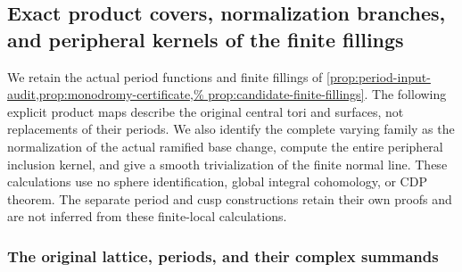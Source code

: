 \subsection{Exact product covers, normalization branches, and peripheral kernels of the finite fillings}
\label{ffcert:sec:finite-fillings}

We retain the actual period functions and finite fillings of
\cref{prop:period-input-audit,prop:monodromy-certificate,%
prop:candidate-finite-fillings}. The following explicit product maps
describe the original central tori and surfaces, not replacements of
their periods. We also identify the complete varying family as the
normalization of the actual ramified base change, compute the entire
peripheral inclusion kernel, and give a smooth trivialization of the
finite normal line. These calculations use no sphere identification,
global integral cohomology, or CDP theorem. The separate period and cusp
constructions retain their own proofs and are not inferred from these
finite-local calculations.

\subsubsection{The original lattice, periods, and their complex summands}


